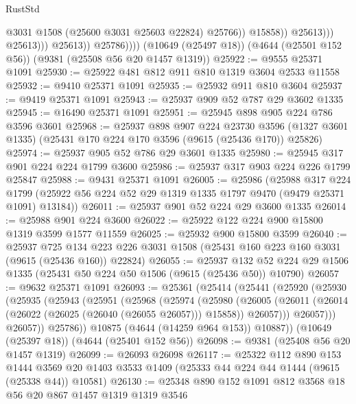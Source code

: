 \begin{lexlean}{RustStd}
\begin{coremodule}
                                    @3031
                                    @1508
                                    (@25600 @3031 @25603 @22824)
                                    @25766))
                                @15858))
                            @25613)))
                      @25613)))
                @25613))
            @25786))))
    (@10649 (@25497 @18))
    (@4644 (@25501 @152 @56))
    (@9381 (@25508 @56 @20 @1457 @1319))
@25922 := @9555 @25371 @1091
@25930 := @25922 @481 @812 @911 @810 @1319 @3604 @2533 @11558
@25932 := @9410 @25371 @1091
@25935 := @25932 @911 @810 @3604
@25937 := @9419 @25371 @1091
@25943 := @25937 @909 @52 @787 @29 @3602 @1335
@25945 := @16490 @25371 @1091
@25951 := @25945 @898 @905 @224 @786 @3596 @3601
@25968 := @25937
    @898
    @907
    @224
    @23730
    @3596
    (@1327 @3601 @1335)
    (@25431 @170 @224 @170 @3596 (@9615 (@25436 @170)) @25826)
@25974 := @25937 @905 @52 @786 @29 @3601 @1335
@25980 := @25945 @317 @901 @224 @224 @1799 @3600
@25986 := @25937 @317 @903 @224 @226 @1799 @25847
@25988 := @9431 @25371 @1091
@26005 := @25986
    (@25988
      @317
      @224
      @1799
      (@25922 @56 @224 @52 @29 @1319 @1335 @1797 @9470 (@9479 @25371 @1091) @13184))
@26011 := @25937 @901 @52 @224 @29 @3600 @1335
@26014 := @25988 @901 @224 @3600
@26022 := @25922 @122 @224 @900 @15800 @1319 @3599 @1577 @11559
@26025 := @25932 @900 @15800 @3599
@26040 := @25937
    @725
    @134
    @223
    @226
    @3031
    @1508
    (@25431 @160 @223 @160 @3031 (@9615 (@25436 @160)) @22824)
@26055 := @25937
    @132
    @52
    @224
    @29
    @1506
    @1335
    (@25431 @50 @224 @50 @1506 (@9615 (@25436 @50)) @10790)
@26057 := @9632 @25371 @1091
@26093 := @25361
    (@25414
      (@25441
        (@25920
          (@25930
            (@25935
              (@25943
                (@25951
                  (@25968
                    (@25974
                      (@25980
                        (@26005
                          (@26011
                            (@26014 (@26022 (@26025 (@26040 (@26055 @26057))) @15858))
                            @26057)))
                      @26057)))
                @26057))
            @25786))
        @10875
        (@4644 (@14259 @964 @153))
        @10887))
    (@10649 (@25397 @18))
    (@4644 (@25401 @152 @56))
@26098 := @9381 (@25408 @56 @20 @1457 @1319)
@26099 := @26093 @26098
@26117 := @25322
    @112
    @890
    @153
    @1444
    @3569
    @20
    @1403
    @3533
    @1409
    (@25333 @44 @224 @44 @1444 (@9615 (@25338 @44)) @10581)
@26130 := @25348 @890 @152 @1091 @812 @3568 @18 @56 @20 @867 @1457 @1319 @1319 @3546

\end{coremodule}
\end{lexlean}
